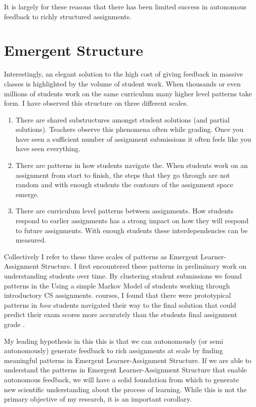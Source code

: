 It is largely for these reasons that there has been limited success in autonomous feedback to richly structured assignments.

\section{Emergent Structure}

Interestingly, an elegant solution to the high cost of giving feedback in massive classes is highlighted by the volume of student work. When thousands or even millions of students work on the same curriculum many higher level patterns take form. I have observed this structure on three different scales. 
\begin{enumerate}
\item There are shared substructures amongst student solutions (and partial solutions). Teachers observe this phenomena often while grading. Once you have seen a sufficient number of assignment submissions it often feels like you have seen everything. 
\item There are patterns in how students navigate the. When students work on an assignment from start to finish, the steps that they go through are not random and with enough students the contours of the assignment space emerge. 
\item There are curriculum level patterns between assignments. How students respond to earlier assignments has a strong impact on how they will respond to future assignments. With enough students these interdependencies can be measured.
\end{enumerate}
Collectively I refer to these three scales of patterns as Emergent Learner-Assignment Structure. I first encountered these patterns in preliminary work on understanding students over time. By clustering student submissions we found patterns in the Using a simple Markov Model of students working through introductory CS assignments. courses, I found that there were prototypical patterns in \emph{how} students navigated their way to the final solution that could predict their exam scores more accurately than the students final assignment grade \cite{piech2012modeling}. 

My leading hypothesis in this this is that we can autonomously (or semi autonomously) generate feedback to rich assignments at scale by finding meaningful patterns in Emergent Learner-Assignment Structure. 
If we are able to understand the patterns in Emergent Learner-Assignment Structure that enable autonomous feedback, we will have a solid foundation from which to generate new scientific understanding about the process of learning. While this is not the primary objective of my research, it is an important corollary.




